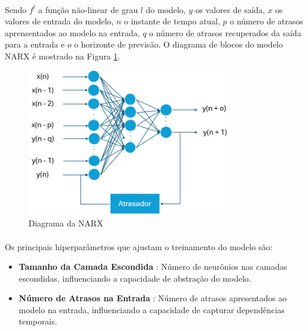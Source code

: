 \paragraph{} Sendo \(f^l\) a função não-linear de grau \(l\) do modelo, \(y\) os valores de saída, \(x\) os valores de entrada do modelo, \(n\) o instante de tempo atual, \(p\) o número de atrasos aprensentados ao modelo na entrada, \(q\) o número de atrasos recuperados da saída para a entrada e \(o\) o horizonte de previsão. O diagrama de blocos do modelo \ac{NARX} é mostrado na Figura \ref{fig:narx_diagram}.

\begin{figure}
	\begin{center}
		\begin{center}
			\includegraphics[width=0.8\textwidth]{figuras/narx_diagram.png}
			\caption{Diagrama da \acs{NARX}}
			\label{fig:narx_diagram}
		\end{center}

	\end{center}
\end{figure}

\paragraph{} Os principais hiperparâmetros que ajustam o treinamento do modelo são:
\begin{itemize}
	\item \textbf{Tamanho da Camada Escondida}      : Número de neurônios nas camadas escondidas, influenciando a capacidade de abstração do modelo.
	\item \textbf{Número de Atrasos na Entrada}		: Número de atrasos apresentados ao modelo na entrada, influenciando a capacidade de capturar dependências temporais.
\end{itemize}

